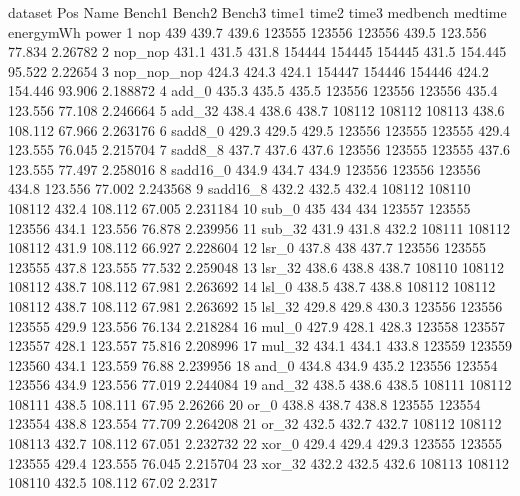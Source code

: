 \begin{filecontents}{dataset}
Pos	Name	Bench1	Bench2	Bench3	time1	time2	time3	medbench	medtime	energymWh	power
1	nop	439	439.7	439.6	123555	123556	123556	439.5	123.556	77.834	2.26782
2	nop\_nop	431.1	431.5	431.8	154444	154445	154445	431.5	154.445	95.522	2.22654
3	nop\_nop\_nop	424.3	424.3	424.1	154447	154446	154446	424.2	154.446	93.906	2.188872
4	add\_0	435.3	435.5	435.5	123556	123556	123556	435.4	123.556	77.108	2.246664
5	add\_32	438.4	438.6	438.7	108112	108112	108113	438.6	108.112	67.966	2.263176
6	sadd8\_0	429.3	429.5	429.5	123556	123555	123555	429.4	123.555	76.045	2.215704
7	sadd8\_8	437.7	437.6	437.6	123556	123555	123555	437.6	123.555	77.497	2.258016
8	sadd16\_0	434.9	434.7	434.9	123556	123556	123556	434.8	123.556	77.002	2.243568
9	sadd16\_8	432.2	432.5	432.4	108112	108110	108112	432.4	108.112	67.005	2.231184
10	sub\_0	435	434	434	123557	123555	123556	434.1	123.556	76.878	2.239956
11	sub\_32	431.9	431.8	432.2	108111	108112	108112	431.9	108.112	66.927	2.228604
12	lsr\_0	437.8	438	437.7	123556	123555	123555	437.8	123.555	77.532	2.259048
13	lsr\_32	438.6	438.8	438.7	108110	108112	108112	438.7	108.112	67.981	2.263692
14	lsl\_0	438.5	438.7	438.8	108112	108112	108112	438.7	108.112	67.981	2.263692
15	lsl\_32	429.8	429.8	430.3	123556	123556	123555	429.9	123.556	76.134	2.218284
16	mul\_0	427.9	428.1	428.3	123558	123557	123557	428.1	123.557	75.816	2.208996
17	mul\_32	434.1	434.1	433.8	123559	123559	123560	434.1	123.559	76.88	2.239956
18	and\_0	434.8	434.9	435.2	123556	123554	123556	434.9	123.556	77.019	2.244084
19	and\_32	438.5	438.6	438.5	108111	108112	108111	438.5	108.111	67.95	2.26266
20	or\_0	438.8	438.7	438.8	123555	123554	123554	438.8	123.554	77.709	2.264208
21	or\_32	432.5	432.7	432.7	108112	108112	108113	432.7	108.112	67.051	2.232732
22	xor\_0	429.4	429.4	429.3	123555	123555	123555	429.4	123.555	76.045	2.215704
23	xor\_32	432.2	432.5	432.6	108113	108112	108110	432.5	108.112	67.02	2.2317
\end{filecontents}


